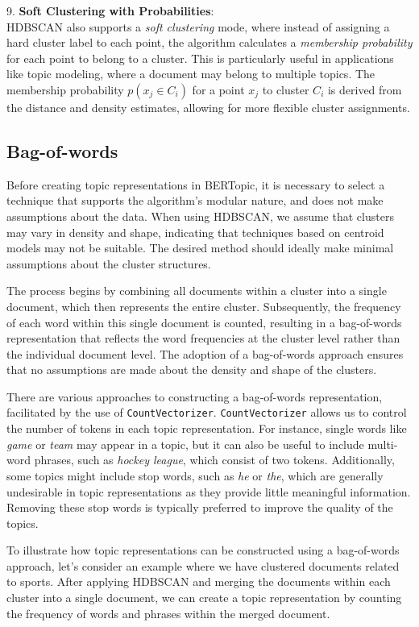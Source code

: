 9. \textbf{Soft Clustering with Probabilities}: \\
HDBSCAN also supports a \textit{soft clustering} mode, where instead of assigning a hard cluster label to each point, the algorithm calculates a \textit{membership probability} for each point to belong to a cluster. This is particularly useful in applications like topic modeling, where a document may belong to multiple topics. The membership probability $p(x_j \in C_i)$ for a point $x_j$ to cluster $C_i$ is derived from the distance and density estimates, allowing for more flexible cluster assignments.

\subsection{Bag-of-words}

Before creating topic representations in BERTopic, it is necessary to select a technique that supports the algorithm's modular nature, and does not make assumptions about the data. When using HDBSCAN, we assume that clusters may vary in density and shape, indicating that techniques based on centroid models may not be suitable. The desired method should ideally make minimal assumptions about the cluster structures.

The process begins by combining all documents within a cluster into a single document, which then represents the entire cluster. Subsequently, the frequency of each word within this single document is counted, resulting in a bag-of-words representation that reflects the word frequencies at the cluster level rather than the individual document level. The adoption of a bag-of-words approach ensures that no assumptions are made about the density and shape of the clusters.

There are various approaches to constructing a bag-of-words representation, facilitated by the use of \texttt{CountVectorizer}. \texttt{CountVectorizer} allows us to control the number of tokens in each topic representation. For instance, single words like \textit{game} or \textit{team} may appear in a topic, but it can also be useful to include multi-word phrases, such as \textit{hockey league}, which consist of two tokens. Additionally, some topics might include stop words, such as \textit{he} or \textit{the}, which are generally undesirable in topic representations as they provide little meaningful information. Removing these stop words is typically preferred to improve the quality of the topics.

To illustrate how topic representations can be constructed using a bag-of-words approach, let's consider an example where we have clustered documents related to sports. After applying HDBSCAN and merging the documents within each cluster into a single document, we can create a topic representation by counting the frequency of words and phrases within the merged document.

